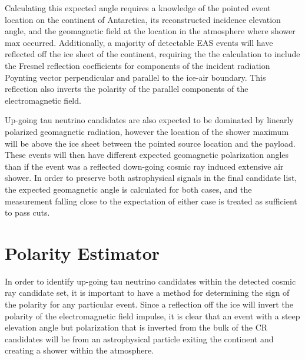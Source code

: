 		Calculating this expected angle requires a knowledge of the pointed event location on the continent of Antarctica, its reconstructed incidence elevation angle, and the geomagnetic field at the location in the atmosphere where shower max occurred.  Additionally, a majority of detectable EAS events will have reflected off the ice sheet of the continent, requiring the the calculation to include the Fresnel reflection coefficients for components of the incident radiation Poynting vector perpendicular and parallel to the ice-air boundary.  This reflection also inverts the polarity of the parallel components of the electromagnetic field.
		
		Up-going tau neutrino candidates are also expected to be dominated by linearly polarized geomagnetic radiation, however the location of the shower maximum will be above the ice sheet between the pointed source location and the payload.  These events will then have different expected geomagnetic polarization angles than if the event was a reflected down-going cosmic ray induced extensive air shower.  In order to preserve both astrophysical signals in the final candidate list, the expected geomagnetic angle is calculated for both cases, and the measurement falling close to the expectation of either case is treated as sufficient to pass cuts.
		
		
\section{Polarity Estimator}%

	In order to identify up-going tau neutrino candidates within the detected cosmic ray candidate set, it is important to have a method for determining the sign of the polarity for any particular event.  Since a reflection off the ice will invert the polarity of the electromagnetic field impulse, it is clear that an event with a steep elevation angle but polarization that is inverted from the bulk of the CR candidates will be from an astrophysical particle exiting the continent and creating a shower within the atmosphere.
	
